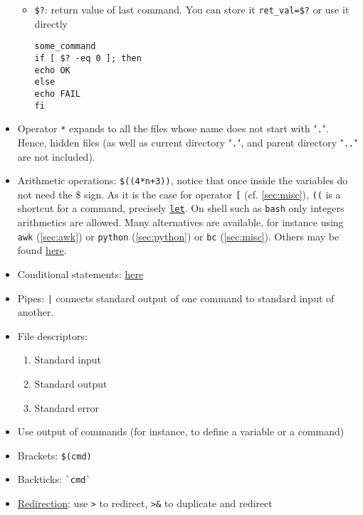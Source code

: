 \documentclass[a4paper,12pt,%
              final%
              ]{article}
\begin{document}
\begin{itemize}
\begin{itemize}
      \item \verb|$?|: return value of last command. You can store it \verb|ret_val=$?| or use it directly
\begin{verbatim}
some_command
if [ $? -eq 0 ]; then
echo OK
else
echo FAIL
fi
\end{verbatim}
    \end{itemize}
  \item Operator \texttt{*} expands to all the files whose name does not start with "\texttt{.}". Hence, hidden files (as well as current directory "\texttt{.}", and parent directory "\texttt{..}" are not included).
  \item Arithmetic operations: \verb|$((4*n+3))|, notice that once inside the variables do not need the \$ sign. As it is the case for operator \verb|[| (cf. \autoref{sec:misc}), \verb|((| is a shortcut for a command, precisely \href{https://www.computerhope.com/unix/bash/let.htm}{\texttt{let}}. On shell such as \texttt{bash} only integers arithmetics are allowed. Many alternatives are available, for instance using \texttt{awk} (\autoref{sec:awk}) or \texttt{python} (\autoref{sec:python}) or \texttt{bc} (\autoref{sec:misc}). Others may be found \href{https://unix.stackexchange.com/questions/40786/how-to-do-integer-float-calculations-in-bash-or-other-languages-frameworks}{here}.
  \item Conditional statements: \href{https://unix.stackexchange.com/questions/306111/what-is-the-difference-between-the-bash-operators-vs-vs-vs}{here}
  \item Pipes: \verb!|! connects standard output of one command to standard input of another.
  \item File descriptors:
    \begin{enumerate}[start=0,label={\texttt{\arabic*} :}]
      \item Standard input
      \item Standard output
      \item Standard error
    \end{enumerate}
  \item Use output of commands (for instance, to define a variable or a command)
  \item Brackets: \verb|$(cmd)|
  \item Backticks: \verb|`cmd`|
  \item \href{https://www.gnu.org/software/bash/manual/bash.html#Redirections}{Redirection}: use \verb|>| to redirect, \verb|>&| to duplicate and redirect
    \begin{itemize}

\end{itemize}
\end{itemize}
\end{document}
